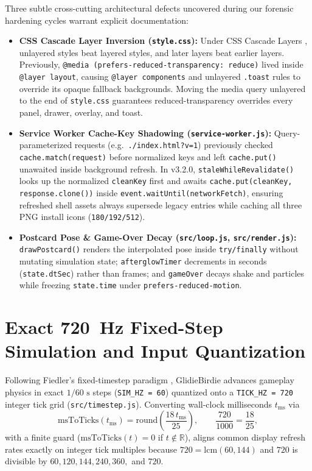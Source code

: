 \documentclass[11pt,letterpaper]{article}
\theoremstyle{remark}
\begin{document}
Three subtle cross-cutting architectural defects uncovered during our forensic hardening cycles warrant explicit documentation:
\begin{itemize}[leftmargin=1.6em, itemsep=1.5pt]
  \item \textbf{CSS Cascade Layer Inversion (\texttt{style.css}):} Under CSS Cascade Layers \cite{csslayers2022}, unlayered styles beat layered styles, and later layers beat earlier layers. Previously, \texttt{@media (prefers-\allowbreak reduced-\allowbreak transparency: reduce)} lived inside \texttt{@layer layout}, causing \texttt{@layer components} and unlayered \texttt{.toast} rules to override its opaque fallback backgrounds. Moving the media query unlayered to the end of \texttt{style.css} guarantees reduced-transparency overrides every panel, drawer, overlay, and toast.
  \item \textbf{Service Worker Cache-Key Shadowing (\texttt{service-worker.js}):} Query-parameterized requests (e.g.\ \texttt{./index.html?v=1}) previously checked \texttt{cache.\allowbreak match(request)} before normalized keys and left \texttt{cache.\allowbreak put()} unawaited inside background refresh. In v3.2.0, \texttt{stale\allowbreak While\allowbreak Revalidate()} looks up the normalized \texttt{cleanKey} first and awaits \texttt{cache.\allowbreak put(cleanKey, response.\allowbreak clone())} inside \texttt{event.\allowbreak waitUntil(networkFetch)}, ensuring refreshed shell assets always supersede legacy entries while caching all three PNG install icons (\texttt{180/192/512}).
  \item \textbf{Postcard Pose \& Game-Over Decay (\texttt{src/loop.js}, \texttt{src/render.js}):} \texttt{drawPostcard()} renders the interpolated pose inside \texttt{try/finally} without mutating simulation state; \texttt{afterglowTimer} decrements in seconds (\texttt{state.dtSec}) rather than frames; and \texttt{gameOver} decays shake and particles while freezing \texttt{state.time} under \texttt{prefers-\allowbreak reduced-\allowbreak motion}.
\end{itemize}

\section{Exact 720~Hz Fixed-Step Simulation and Input Quantization}
\label{sec:timestep}

Following Fiedler's fixed-timestep paradigm \cite{fiedler2004}, GlidieBirdie advances gameplay physics in exact $1/60\text{ s}$ steps (\texttt{SIM\_HZ = 60}) quantized onto a \texttt{TICK\_HZ = 720} integer tick grid (\texttt{src/timestep.js}). Converting wall-clock milliseconds $t_{\text{ms}}$ via
\begin{equation}
  \mathrm{msToTicks}(t_{\text{ms}}) = \mathrm{round}\!\left(\frac{18\, t_{\text{ms}}}{25}\right), \qquad \frac{720}{1000} = \frac{18}{25},
\end{equation}
with a finite guard ($\mathrm{msToTicks}(t) = 0$ if $t \notin \mathbb{R}$), aligns common display refresh rates exactly on integer tick multiples because $720 = \mathrm{lcm}(60, 144)$ and $720$ is divisible by $60, 120, 144, 240, 360,$ and $720$.
\end{document}
